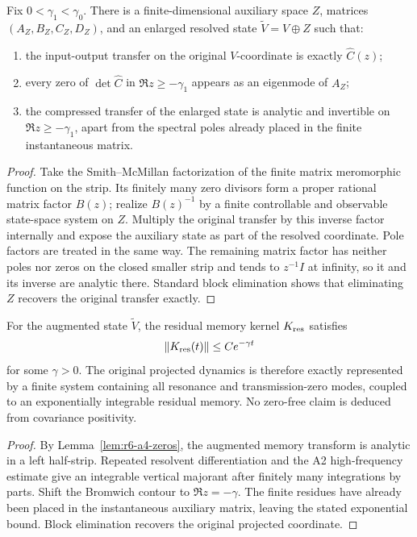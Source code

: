 \begin{lemma}
\label{lem:r6-a4-zeros}
Fix \(0<\gamma_1<\gamma_0\).  There is a finite-dimensional auxiliary space
\(Z\), matrices \((A_Z,B_Z,C_Z,D_Z)\), and an enlarged resolved state
\(\widetilde V=V\oplus Z\) such that:
\begin{enumerate}[label=(\roman*)]
\item the input-output transfer on the original \(V\)-coordinate is exactly
\(\widehat C(z)\);
\item every zero of \(\det\widehat C\) in
\(\Re z\ge-\gamma_1\) appears as an eigenmode of \(A_Z\);
\item the compressed transfer of the enlarged state is analytic and
invertible on \(\Re z\ge-\gamma_1\), apart from the spectral poles already
placed in the finite instantaneous matrix.
\end{enumerate}
\end{lemma}

\begin{proof}
Take the Smith--McMillan factorization of the finite matrix meromorphic
function on the strip.  Its finitely many zero divisors form a proper rational
matrix factor \(B(z)\); realize \(B(z)^{-1}\) by a finite controllable and
observable state-space system on \(Z\).  Multiply the original transfer by
this inverse factor internally and expose the auxiliary state as part of the
resolved coordinate.  Pole factors are treated in the same way.  The
remaining matrix factor has neither poles nor zeros on the closed smaller
strip and tends to \(z^{-1}I\) at infinity, so it and its inverse are analytic
there.  Standard block elimination shows that eliminating \(Z\) recovers the
original transfer exactly.
\end{proof}

\begin{theorem}
\label{thm:r6-a4-decay}
For the augmented state \(\widetilde V\), the residual memory kernel
\(K_{\rm res}\) satisfies
\[
\|K_{\rm res}(t)\|\le Ce^{-\gamma t}
\]
for some \(\gamma>0\).  The original projected dynamics is therefore exactly
represented by a finite system containing all resonance and transmission-zero
modes, coupled to an exponentially integrable residual memory.  No zero-free
claim is deduced from covariance positivity.
\end{theorem}

\begin{proof}
By Lemma~\ref{lem:r6-a4-zeros}, the augmented memory transform is analytic in
a left half-strip.  Repeated resolvent differentiation and the A2
high-frequency estimate give an integrable vertical majorant after finitely
many integrations by parts.  Shift the Bromwich contour to
\(\Re z=-\gamma\).  The finite residues have already been placed in the
instantaneous auxiliary matrix, leaving the stated exponential bound.  Block
elimination recovers the original projected coordinate.
\end{proof}

